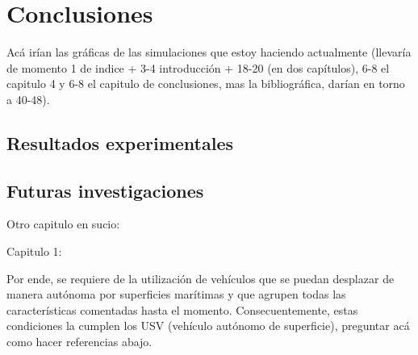 \newpage
\thispagestyle{empty}
\mbox{}


\chapter{Conclusiones}
\label{ch:chapter5}


Acá irían las gráficas de las simulaciones que estoy haciendo actualmente (llevaría de momento 1 de indice + 3-4 introducción + 18-20 (en dos capítulos), 6-8 el capitulo 4 y 6-8 el capitulo de conclusiones, mas la bibliográfica, darían en torno a 40-48).

\section{Resultados experimentales}

\section{Futuras investigaciones}


Otro capitulo en sucio:

Capitulo 1:


Por ende, se requiere de la utilización de vehículos que se puedan desplazar de manera autónoma por superficies marítimas y que agrupen todas las características comentadas hasta el momento. Consecuentemente, estas condiciones la cumplen los USV (vehículo autónomo de superficie), preguntar acá como hacer referencias abajo.\\

